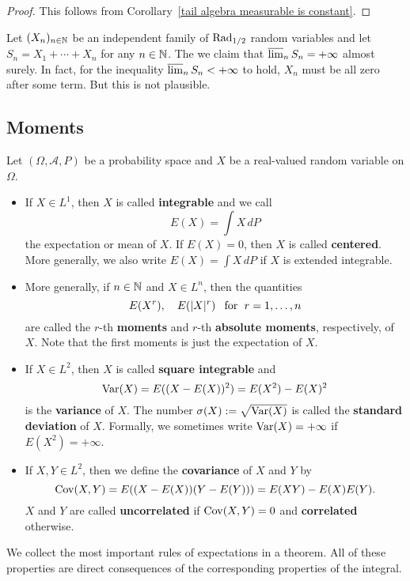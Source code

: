 \begin{proof}
This follows from Corollary~\ref{tail algebra measurable is constant}.
\end{proof}
\begin{example}
Let $(X_n)_{n\in\mathbb{N}}$ be an independent family of $\mathrm{Rad}_{1/2}$ random variables and let $S_n=X_1+\cdots+X_n$ for any $n\in\mathbb{N}$. The we claim that $\varlimsup_{n}S_n=+\infty$ almost surely. In fact, for the inequality $\varlimsup_nS_n<+\infty$ to hold, $X_n$ must be all zero after some term. But this is not plausible.
\end{example}
\subsection{Moments}
\begin{definition}
Let $(\Omega,\mathcal{A},P)$ be a probability space and $X$ be a real-valued random variable on $\Omega$.
\begin{itemize}
\item If $X\in L^1$, then $X$ is called \textbf{integrable} and we call
\[E(X)=\int X\,dP\]
the expectation or mean of $X$. If $E(X)=0$, then $X$ is called \textbf{centered}. More generally, we also write $E(X)=\int X\,dP$ if $X$ is extended integrable.
\item More generally, if $n\in\mathbb{N}$ and $X\in L^n$, then the quantities
\[E(X^r),\quad E(|X|^r)\hspace{8pt}\text{for}\hspace{6pt} r=1,\dots,n\]
are called the $r$-th \textbf{moments} and $r$-th \textbf{absolute moments}, respectively, of $X$. Note that the first moments is just the expectation of $X$.
\item If $X\in L^2$, then $X$ is called \textbf{square integrable} and
\[\mathrm{Var}(X)=E((X-E(X))^2)=E(X^2)-E(X)^2\]
is the \textbf{variance} of $X$. The number $\sigma(X):=\sqrt{\mathrm{Var}(X)}$ is called the \textbf{standard deviation} of $X$. Formally, we sometimes write $\mathrm{Var}(X)=+\infty$ if $E(X^2)=+\infty$.
\item If $X,Y\in L^2$, then we define the \textbf{covariance} of $X$ and $Y$ by
\[\mathrm{Cov}(X,Y)=E((X-E(X))(Y-E(Y)))=E(XY)-E(X)E(Y).\]
$X$ and $Y$ are called \textbf{uncorrelated} if $\mathrm{Cov}(X,Y)=0$ and \textbf{correlated} otherwise.
\end{itemize}
\end{definition}
We collect the most important rules of expectations in a theorem. All of these properties are direct consequences of the corresponding properties of the integral.
